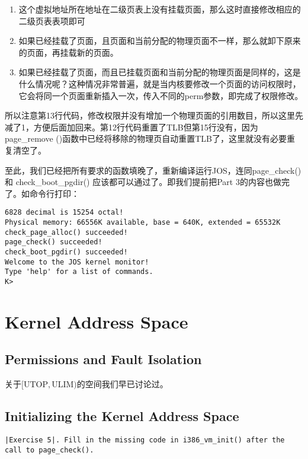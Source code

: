 \documentclass{article}
\newcommand{\funcname}[1]{{\ttfamily \small #1}}
\begin{document}
\begin{CJK*}{UTF8}{gkai}
\begin{enumerate}
\item{这个虚拟地址所在地址在二级页表上没有挂载页面，那么这时直接修改相应的二级页表表项即可}
\item{如果已经挂载了页面，且页面和当前分配的物理页面不一样，那么就卸下原来的页面，再挂载新的页面。}
\item{如果已经挂载了页面，而且已挂载页面和当前分配的物理页面是同样的，这是什么情况呢？这种情况非常普遍，就是当内核要修改一个页面的访问权限时，它会将同一个页面重新插入一次，传入不同的perm参数，即完成了权限修改。}
\end{enumerate}

所以注意第13行代码，修改权限并没有增加一个物理页面的引用数目，所以这里先减了1，方便后面加回来。第12行代码重置了TLB但第15行没有，因为\funcname{page\_remove ()}函数中已经将移除的物理页自动重置TLB了，这里就没有必要重复清空了。

至此，我们已经把所有要求的函数填晚了，重新编译运行JOS，连同page\_check() 和 check\_boot\_pgdir() 应该都可以通过了。即我们提前把Part 3的内容也做完了。如命令行打印：

\begin{lstlisting}[style=console]
6828 decimal is 15254 octal!
Physical memory: 66556K available, base = 640K, extended = 65532K
check_page_alloc() succeeded!
page_check() succeeded!
check_boot_pgdir() succeeded!
Welcome to the JOS kernel monitor!
Type 'help' for a list of commands.
K> 
\end{lstlisting}


\section{Kernel Address Space}

\subsection{Permissions and Fault Isolation}

关于$[\mathrm{UTOP},\mathrm{ULIM})$的空间我们早已讨论过。

\subsection{Initializing the Kernel Address Space}

\begin{lstlisting}[style=exercise]
|Exercise 5|. Fill in the missing code in i386_vm_init() after the call to page_check().


\end{lstlisting}
\end{CJK*}
\end{document}
